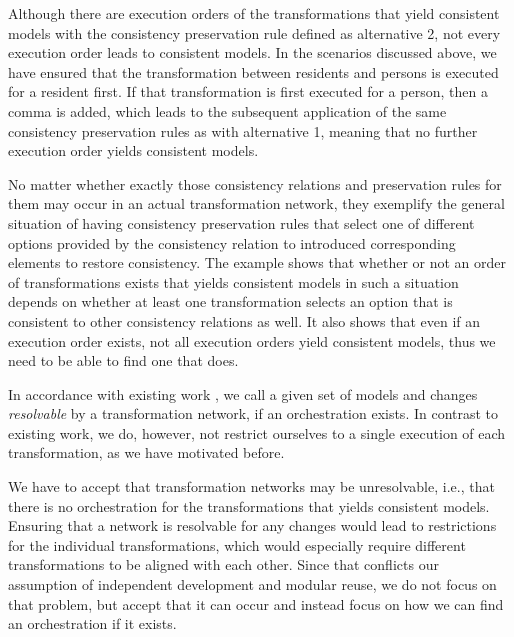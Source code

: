 Although there are execution orders of the transformations that yield consistent models with the consistency preservation rule defined as alternative 2, not every execution order leads to consistent models.
In the scenarios discussed above, we have ensured that the transformation between residents and persons is executed for a resident first.
If that transformation is first executed for a person, then a comma is added, which leads to the subsequent application of the same consistency preservation rules as with alternative 1, meaning that no further execution order yields consistent models.

No matter whether exactly those consistency relations and preservation rules for them may occur in an actual transformation network, they exemplify the general situation of having consistency preservation rules that select one of different options provided by the consistency relation to introduced corresponding elements to restore consistency.
The example shows that whether or not an order of transformations exists that yields consistent models in such a situation depends on whether at least one transformation selects an option that is consistent to other consistency relations as well.
It also shows that even if an execution order exists, not all execution orders yield consistent models, thus we need to be able to find one that does.

In accordance with existing work \cite{stevens2020BidirectionalTransformationLarge-SoSym}, we call a given set of models and changes \emph{resolvable} by a transformation network, if an orchestration exists.
In contrast to existing work, we do, however, not restrict ourselves to a single execution of each transformation, as we have motivated before.

We have to accept that transformation networks may be unresolvable, i.e., that there is no orchestration for the transformations that yields consistent models.
Ensuring that a network is resolvable for any changes would lead to restrictions for the individual transformations, which would especially require different transformations to be aligned with each other.
Since that conflicts our assumption of independent development and modular reuse, we do not focus on that problem, but accept that it can occur and instead focus on how we can find an orchestration if it exists. 

